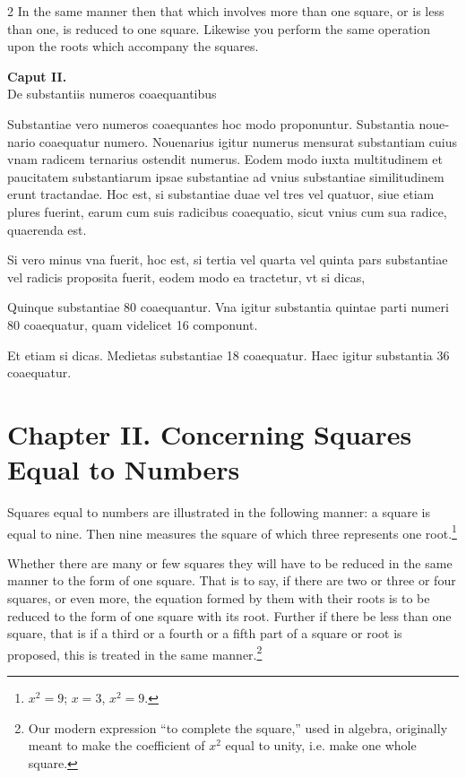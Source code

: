 \documentclass[11pt,a4paper,twoside]{book}
\newcommand{\latincolumn}[1]{\textlatin{\small #1}}
\begin{document}
\begin{paracol}{2}
In the same manner then that which involves more than one square, or is less than one, is reduced to one square. Likewise you perform the same operation upon the roots which accompany the squares.

\switchcolumn*

\begin{center}
{\normalsize\bfseries\color{sectioncolor} Caput II.}\\[0.2cm]
\latincolumn{De substantiis numeros coaequantibus}
\end{center}

\medskip

\latincolumn{Substantiae vero numeros coaequantes hoc modo proponuntur. Substantia nouenario coaequatur numero. Nouenarius igitur numerus mensurat substantiam cuius vnam radicem ternarius ostendit numerus. Eodem modo iuxta multitudinem et paucitatem substantiarum ipsae substantiae ad vnius substantiae similitudinem erunt tractandae. Hoc est, si substantiae duae vel tres vel quatuor, siue etiam plures fuerint, earum cum suis radicibus coaequatio, sicut vnius cum sua radice, quaerenda est.}

\medskip

\latincolumn{Si vero minus vna fuerit, hoc est, si tertia vel quarta vel quinta pars substantiae vel radicis proposita fuerit, eodem modo ea tractetur, vt si dicas,}

\medskip

\latincolumn{Quinque substantiae 80 coaequantur. Vna igitur substantia quintae parti numeri 80 coaequatur, quam videlicet 16 componunt.}

\medskip

\latincolumn{Et etiam si dicas. Medietas substantiae 18 coaequatur. Haec igitur substantia 36 coaequatur.}

\switchcolumn

\section*{Chapter II. Concerning Squares Equal to Numbers}

Squares equal to numbers are illustrated in the following manner: a square is equal to nine. Then nine measures the square of which three represents one root.\footnote{$x^2 = 9$; $x = 3$, $x^2 = 9$.}

Whether there are many or few squares they will have to be reduced in the same manner to the form of one square. That is to say, if there are two or three or four squares, or even more, the equation formed by them with their roots is to be reduced to the form of one square with its root. Further if there be less than one square, that is if a third or a fourth or a fifth part of a square or root is proposed, this is treated in the same manner.\footnote{Our modern expression ``to complete the square,'' used in algebra, originally meant to make the coefficient of $x^2$ equal to unity, i.e. make one whole square.}


\end{paracol}
\end{document}
